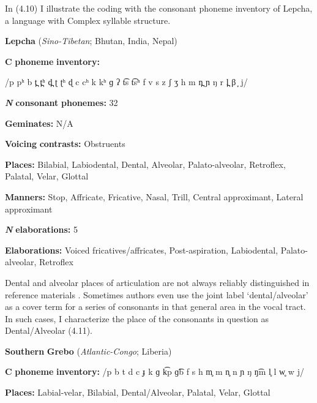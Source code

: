   In (4.10) I illustrate the coding with the consonant phoneme inventory of Lepcha, a language with Complex syllable structure.



\ea\label{ex:(4.10)}
  \textbf{Lepcha} (\textit{Sino-Tibetan}; Bhutan, India, Nepal)



\textbf{C} \textbf{phoneme} \textbf{inventory:} 



/p pʰ b t̪ t̪ʰ d̪ ʈ ʈʰ ɖ c cʰ k kʰ ɡ ʔ t͡s t͡sʰ f v s z ʃ ʒ h m n̪ ɲ ŋ r l̪ β ̞ j/



\textbf{\textit{N}} \textbf{consonant} \textbf{phonemes:} 32



\textbf{Geminates:} N/A



\textbf{Voicing} \textbf{contrasts:} Obstruents



\textbf{Places:} Bilabial, Labiodental, Dental, Alveolar, Palato-alveolar, Retroflex, Palatal, Velar, Glottal



\textbf{Manners:} Stop, Affricate, Fricative, Nasal, Trill, Central approximant, Lateral approximant



\textbf{\textit{N}} \textbf{elaborations:} 5



\textbf{Elaborations:} Voiced fricatives/affricates, Post-aspiration, Labiodental, Palato-alveolar, Retroflex

\z


  Dental and alveolar places of articulation are not always reliably distinguished in reference materials \citep[31-32]{Maddieson1984}. Sometimes authors even use the joint label ‘dental/alveolar’ as a cover term for a series of consonants in that general area in the vocal tract. In such cases, I characterize the place of the consonants in question as Dental/Alveolar (4.11).



\ea\label{ex:(4.11)}
  \textbf{Southern} \textbf{Grebo} (\textit{Atlantic-Congo}; Liberia)



\textbf{C} \textbf{phoneme} \textbf{inventory:} /p b t d c ɟ k ɡ k͡p ɡ͡b f s h m̥ m n̥ n ɲ ŋ ŋ͡m l̥ l w̥ w j/



\textbf{Places:} Labial-velar, Bilabial, Dental/Alveolar, Palatal, Velar, Glottal

